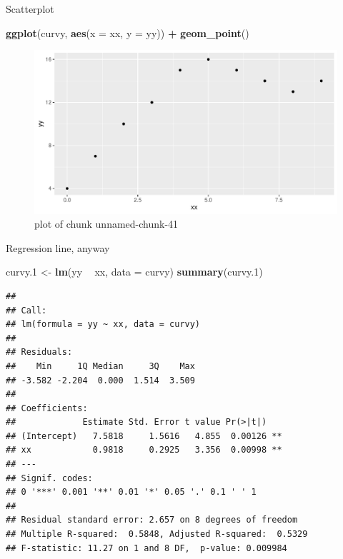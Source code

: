 \documentclass[ignorenonframetext,]{beamer}
\newenvironment{Shaded}{\begin{snugshade}}{\end{snugshade}}
\newcommand{\DataTypeTok}[1]{\textcolor[rgb]{0.13,0.29,0.53}{#1}}
\newcommand{\FloatTok}[1]{\textcolor[rgb]{0.00,0.00,0.81}{#1}}
\newcommand{\KeywordTok}[1]{\textcolor[rgb]{0.13,0.29,0.53}{\textbf{#1}}}
\newcommand{\NormalTok}[1]{#1}
\newcommand{\OperatorTok}[1]{\textcolor[rgb]{0.81,0.36,0.00}{\textbf{#1}}}
\newcommand{\StringTok}[1]{\textcolor[rgb]{0.31,0.60,0.02}{#1}}
\begin{document}
\begin{frame}[fragile]{Scatterplot}
\protect\hypertarget{scatterplot}{}

\begin{Shaded}
\begin{Highlighting}[]
\KeywordTok{ggplot}\NormalTok{(curvy, }\KeywordTok{aes}\NormalTok{(}\DataTypeTok{x =}\NormalTok{ xx, }\DataTypeTok{y =}\NormalTok{ yy)) }\OperatorTok{+}\StringTok{ }\KeywordTok{geom_point}\NormalTok{()}
\end{Highlighting}
\end{Shaded}

\begin{figure}
\centering
\includegraphics{figure/unnamed-chunk-41-1.pdf}
\caption{plot of chunk unnamed-chunk-41}
\end{figure}

\end{frame}

\begin{frame}[fragile]{Regression line, anyway}
\protect\hypertarget{regression-line-anyway}{}

\scriptsize

\begin{Shaded}
\begin{Highlighting}[]
\NormalTok{curvy}\FloatTok{.1}\NormalTok{ <-}\StringTok{ }\KeywordTok{lm}\NormalTok{(yy }\OperatorTok{~}\StringTok{ }\NormalTok{xx, }\DataTypeTok{data =}\NormalTok{ curvy)}
\KeywordTok{summary}\NormalTok{(curvy}\FloatTok{.1}\NormalTok{)}
\end{Highlighting}
\end{Shaded}

\begin{verbatim}
## 
## Call:
## lm(formula = yy ~ xx, data = curvy)
## 
## Residuals:
##    Min     1Q Median     3Q    Max 
## -3.582 -2.204  0.000  1.514  3.509 
## 
## Coefficients:
##             Estimate Std. Error t value Pr(>|t|)   
## (Intercept)   7.5818     1.5616   4.855  0.00126 **
## xx            0.9818     0.2925   3.356  0.00998 **
## ---
## Signif. codes:  
## 0 '***' 0.001 '**' 0.01 '*' 0.05 '.' 0.1 ' ' 1
## 
## Residual standard error: 2.657 on 8 degrees of freedom
## Multiple R-squared:  0.5848, Adjusted R-squared:  0.5329 
## F-statistic: 11.27 on 1 and 8 DF,  p-value: 0.009984
\end{verbatim}

\normalsize

\end{frame}
\end{document}
